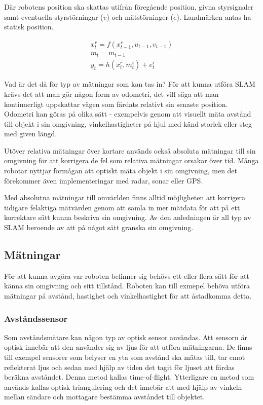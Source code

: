 \documentclass[a4paper,12pt,fleqn]{article}
\begin{document}
Där robotens position ska skattas utifrån föregående position, givna styrsignaler samt eventuella styrstörningar ($v$) och mätstörninger ($e$). Landmärken antas ha statisk position. 

\begin{gather}
x_{t}^r = f(x_{t-1}^r, u_{t-1}, v_{t-1}) \\
m_{t} = m_{t-1} \\
y_{t} = h(x_{t}^r,m_{t}^i) + e_{t}^i
\end{gather}

%
Vad är det då för typ av mätningar som kan tas in? För att kunna utföra SLAM krävs det att man gör någon form av odometri, det vill säga att man kontinuerligt uppskattar vägen som färdats relativt sin senaste position. Odometri kan göras på olika sätt - exempelvis genom att visuellt mäta avstånd till objekt i sin omgivning, vinkelhastigheter på hjul med känd storlek eller steg med given längd. 

Utöver relativa mätningar över kortare används också absoluta mätningar till sin omgivning för att korrigera de fel som relativa mätningar orsakar över tid. Många robotar nyttjar förmågan att optiskt mäta objekt i sin omgivning, men det förekommer även implementeringar med radar, sonar eller GPS. 

Med absolutna mätningar till omvärlden finns alltid möjligheten att korrigera tidigare felaktiga mätvärden genom att samla in mer mätdata för att på ett korrektare sätt kunna beskriva sin omgivning. Av den anledningen är all typ av SLAM beroende av att på något sätt granska sin omgivning. 

\subsection{Mätningar}

För att kunna avgöra var roboten befinner sig behövs ett eller flera sätt för att känna sin omgivning och sitt tillstånd. Roboten kan till exmepel behöva utföra mätningar på avstånd, hastighet och vinkelhastighet för att åstadkomma detta. 

\subsubsection{Avståndssensor}

Som avståndsmätare kan någon typ av optisk sensor användas. Att sensorn är optisk innebär att den använder sig av ljus för att utföra mätningarna. De finns till exempel sensorer som belyser en yta som avstånd ska mätas till, tar emot reflekterat ljus och sedan med hjälp av tiden det tagit för ljuset att färdas beräkna avståndet. Denna metod kallas time-of-flight. Ytterligare en metod som används kallas optisk triangulering och det innebär att med hjälp av vinkeln mellan sändare och mottagare bestämma avståndet till objektet.
\newpage
\end{document}
